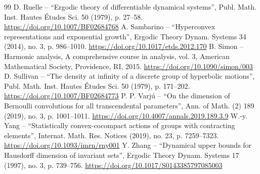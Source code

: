 \begin{thebibliography}{99}
 D. Ruelle – “Ergodic theory of differentiable dynamical systems”, Publ. Math. Inst. Hautes Études Sci. 50 (1979), p. 27–58. \url{https://doi.org/10.1007/BF02684768}
 A. Sambarino – “Hyperconvex representations and exponential growth”, Ergodic Theory Dynam. Systems 34 (2014), no. 3, p. 986–1010. \url{https://doi.org/10.1017/etds.2012.170}
 B. Simon – Harmonic analysis, A comprehensive course in analysis, vol. 3, American Mathematical Society, Providence, RI, 2015. \url{https://doi.org/10.1090/simon/003}
 D. Sullivan – “The density at infinity of a discrete group of hyperbolic motions”, Publ. Math. Inst. Hautes Études Sci. 50 (1979), p. 171–202. \url{https://doi.org/10.1007/BF02684773}
 P. P. Varjú – “On the dimension of Bernoulli convolutions for all transcendental parameters”, Ann. of Math. (2) 189 (2019), no. 3, p. 1001–1011. \url{https://doi.org/10.4007/annals.2019.189.3.9}
 W.-y. Yang – “Statistically convex-cocompact actions of groups with contracting elements”, Internat. Math. Res. Notices (2019), no. 23, p. 7259–7323. \url{https://doi.org/10.1093/imrn/rny001}
 Y. Zhang – “Dynamical upper bounds for Hausdorff dimension of invariant sets”, Ergodic Theory Dynam. Systems 17 (1997), no. 3, p. 739–756. \url{https://doi.org/10.1017/S0143385797085003}
\end{thebibliography}
